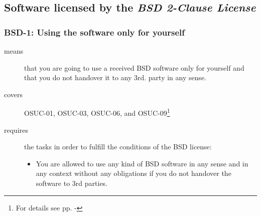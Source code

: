 \begin{center}
\begin{footnotesize}
{{{{{{           
        }


      }
 
    }
   }   

  }
}
\end{footnotesize}
\end{center}

\subsection{Software licensed by the \emph{BSD 2-Clause License}}

\subsubsection{BSD-1: Using the software only for yourself}
\label{OSUC-01-BSD} 
\label{OSUC-03-BSD} 
\label{OSUC-06-BSD}
\label{OSUC-09-BSD}
  
\begin{description}
\item[means] that you are going to use a received BSD software only for yourself
and that you do not handover it to any 3rd. party in any sense.
\item[covers] OSUC-01, OSUC-03, OSUC-06, and OSUC-09\footnote{For details see pp.
  \pageref{OSUC-01-DEF} - \pageref{OSUC-09-DEF}}
\item[requires] the tasks in order to fulfill the conditions
    of the BSD license:
  \begin{itemize}
    \item You are allowed to use any kind of BSD software in any sense and in
    any context without any obligations if you do not handover the software to
    3rd parties.
  \end{itemize}
\end{description}


